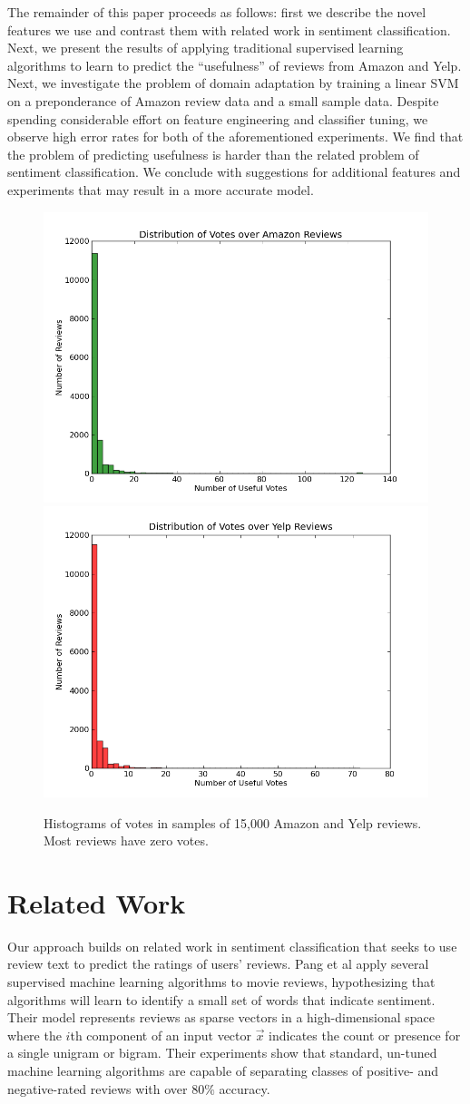 \documentclass[letterpaper]{article}
\begin{document}
The remainder of this paper proceeds as follows: first we describe the novel 
features we use and contrast them with related work in sentiment 
classification.  Next, we present the results of applying traditional 
supervised learning algorithms to learn to predict the ``usefulness'' of 
reviews from Amazon and Yelp.  Next, we investigate the problem of domain 
adaptation by training a linear SVM on a preponderance of Amazon review data 
and a small sample data.  Despite spending considerable effort on feature 
engineering and classifier tuning, we observe high error rates for both of the 
aforementioned experiments.  We find that the problem of predicting usefulness 
is harder than the related problem of sentiment classification.  We conclude 
with suggestions for additional features and experiments that may result in 
a more accurate model.

\begin{figure}[h]
    \label{fig:vote-histos}
	\centering
	\includegraphics[width=0.30\linewidth]{amz_histo}
    \includegraphics[width=0.30\linewidth]{yelp_histo}
	\caption{Histograms of votes in samples of 15,000 Amazon and Yelp reviews.
    Most reviews have zero votes.}
\end{figure}

\section{Related Work}
Our approach builds on related work in sentiment classification that seeks to 
use review text to predict the ratings of users' reviews.  Pang et al 
\cite{PangSentimentClassification} apply several supervised machine learning 
algorithms to movie reviews, hypothesizing that algorithms will learn to
identify a small set of words that indicate sentiment.  Their model represents 
reviews as sparse vectors in a high-dimensional space where the $i$th component 
of an input vector $\vec{x}$ indicates the count or presence for a single 
unigram or bigram.  Their experiments show that standard, un-tuned machine 
learning algorithms are capable of separating classes of positive- and 
negative-rated reviews with over $80\%$ accuracy.  
\end{document}
